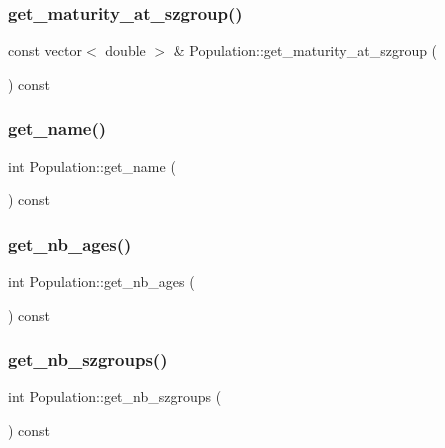 \mbox{\label{class_population_aea95227073a7345f0b2237ad90b854e1}} 
\subsubsection{\texorpdfstring{get\_maturity\_at\_szgroup()}{get\_maturity\_at\_szgroup()}}
{\footnotesize\ttfamily const vector$<$ double $>$ \& Population\+::get\+\_\+maturity\+\_\+at\+\_\+szgroup (\begin{DoxyParamCaption}{ }\end{DoxyParamCaption}) const}

\mbox{\label{class_population_a60dfa66b65b6146ea6f2f49a40667d0c}} 
\subsubsection{\texorpdfstring{get\_name()}{get\_name()}}
{\footnotesize\ttfamily int Population\+::get\+\_\+name (\begin{DoxyParamCaption}{ }\end{DoxyParamCaption}) const}

\mbox{\label{class_population_a1a8f8cdab0d8527983d4cf2c72292ca0}} 
\subsubsection{\texorpdfstring{get\_nb\_ages()}{get\_nb\_ages()}}
{\footnotesize\ttfamily int Population\+::get\+\_\+nb\+\_\+ages (\begin{DoxyParamCaption}{ }\end{DoxyParamCaption}) const}

\mbox{\label{class_population_aea1eba0e5aaab417352b9821b36f650d}} 
\subsubsection{\texorpdfstring{get\_nb\_szgroups()}{get\_nb\_szgroups()}}
{\footnotesize\ttfamily int Population\+::get\+\_\+nb\+\_\+szgroups (\begin{DoxyParamCaption}{ }\end{DoxyParamCaption}) const}


